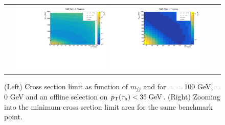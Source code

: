 \begin{figure}[tbh!]
	\centering
	\begin{tabular}{cc}
		\includegraphics[width=0.45\textwidth]{analysis/pics/JetInvMass_vs_MET_xsec_chi100_lsp000_taupt35.pdf}
		\includegraphics[width=0.45\textwidth]{analysis/pics/JetInvMass_vs_MET_xsec_chi100_lsp000_taupt35_zoom.pdf}
	\end{tabular}
	\caption{(Left) Cross section limit as function of $m_{jj}$ and \met for \charginopm = \neutralinotwo = 100 GeV, \neutralinoone = 0 GeV and an offline selection on $p_{\text{T}}(\tau_{\text{h}}) <  35\;\text{Ge}\kern-0.06667em\text{V}$. (Right) Zooming into the minimum cross section limit area for the same benchmark point.}
	\label{fig::JetInvMass_vs_MET_xsec_chi100_lsp000_taupt35}
\end{figure}

